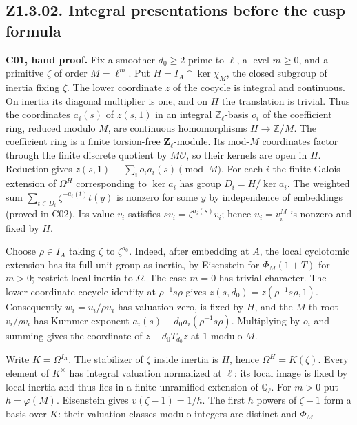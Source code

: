 \subsection{Z1.3.02. Integral presentations before the cusp formula}\label{r7:Z1.3.02}
\textbf{C01, hand proof.} Fix a smoother \(d_0\ge2\) prime to \(\ell\), a level \(m\ge0\), and a primitive
\(\zeta\) of order \(M=\ell^m\). Put \(H=I_A\cap\ker\chi_M\), the closed subgroup of inertia fixing \(\zeta\).
The lower coordinate \(z\) of the cocycle is integral and continuous.
On inertia its diagonal multiplier is one, and on \(H\) the translation
is trivial. Thus the coordinates \(a_i(s)\) of \(z(s,1)\) in an
integral \(\mathbb Z_\ell\)-basis \(o_i\) of the coefficient ring, reduced
modulo \(M\), are continuous homomorphisms \(H\to\mathbb Z/M\).
The coefficient ring is a finite torsion-free \(\mathbf Z_\ell\)-module. Its mod-\(M\) coordinates factor through the finite discrete quotient by \(M\mathcal O\), so their kernels are open in \(H\). Reduction gives
\(z(s,1)\equiv\sum_i o_i a_i(s)\pmod M\).
For each \(i\) the finite Galois extension of \(\Omega^H\) corresponding
to \(\ker a_i\) has group \(D_i=H/\ker a_i\). The weighted sum
\(\sum_{t\in D_i}\zeta^{-a_i(t)}t(y)\) is nonzero for some \(y\) by
independence of embeddings (proved in C02). Its value \(v_i\) satisfies
\(s v_i=\zeta^{a_i(s)}v_i\); hence \(u_i=v_i^M\) is nonzero and fixed by \(H\).
\par Choose \(\rho\in I_A\) taking \(\zeta\) to \(\zeta^{d_0}\).
Indeed, after embedding at \(A\), the local cyclotomic extension
has its full unit group as inertia, by Eisenstein for \(\Phi_M(1+T)\)
for \(m>0\); restrict local inertia to \(\Omega\).
The case \(m=0\) has trivial character.
The lower-coordinate cocycle identity at \(\rho^{-1}s\rho\) gives
\(z(s,d_0)=z(\rho^{-1}s\rho,1)\). Consequently \(w_i=u_i/\rho u_i\)
has valuation zero, is fixed by \(H\), and the \(M\)-th root
\(v_i/\rho v_i\) has Kummer exponent
\(a_i(s)-d_0a_i(\rho^{-1}s\rho)\). Multiplying by \(o_i\) and summing
gives the coordinate of \(z-d_0T_{d_0}z\) at \(1\) modulo \(M\).
\par Write \(K=\Omega^{I_A}\). The stabilizer of \(\zeta\) inside
inertia is \(H\), hence \(\Omega^H=K(\zeta)\).
Every element of \(K^\times\) has integral valuation normalized at
\(\ell\): its local image is fixed by local inertia and thus lies in a
finite unramified extension of \(\mathbb Q_\ell\). For \(m>0\) put
\(h=\varphi(M)\). Eisenstein gives \(v(\zeta-1)=1/h\).
The first \(h\) powers of \(\zeta-1\) form a basis over \(K\):
their valuation classes modulo integers are distinct and \(\Phi_M\)
